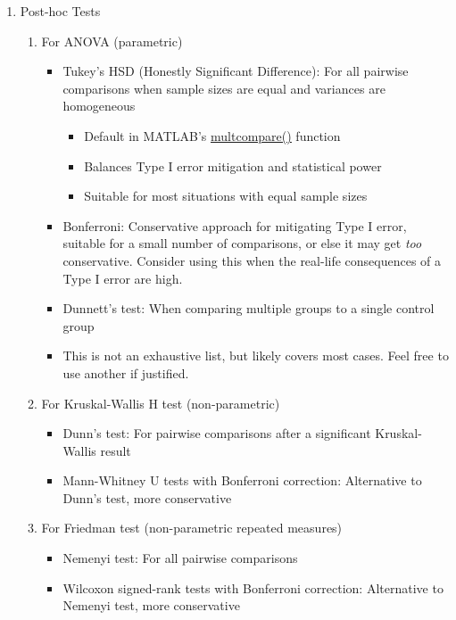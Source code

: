 \documentclass{article}
\newcommand{\ulink}[2]{\href{#1}{\ul{#2}}}
\begin{document}
\begin{enumerate}
    \item Post-hoc Tests
    \begin{enumerate}
        \item For ANOVA (parametric)
        \begin{itemize}
            \item Tukey's HSD (Honestly Significant Difference): For all pairwise comparisons when sample sizes are equal and variances are homogeneous
            \begin{itemize}
                \item Default in MATLAB's \ulink{https://www.mathworks.com/help/stats/multiple-comparisons.html\#bum7ue_-1}{multcompare()} function
                \item Balances Type I error mitigation and statistical power
                \item Suitable for most situations with equal sample sizes
            \end{itemize}
            \item Bonferroni: Conservative approach for mitigating Type I error, suitable for a small number of comparisons, or else it may get \textit{too} conservative. Consider using this when the real-life consequences of a Type I error are high.
            \item Dunnett's test: When comparing multiple groups to a single control group
            \item This is not an exhaustive list, but likely covers most cases. Feel free to use another if justified.
        \end{itemize}
        \item For Kruskal-Wallis H test (non-parametric)
        \begin{itemize}
            \item Dunn's test: For pairwise comparisons after a significant Kruskal-Wallis result
            \item Mann-Whitney U tests with Bonferroni correction: Alternative to Dunn's test, more conservative
        \end{itemize}
        \item For Friedman test (non-parametric repeated measures)
        \begin{itemize}
            \item Nemenyi test: For all pairwise comparisons
            \item Wilcoxon signed-rank tests with Bonferroni correction: Alternative to Nemenyi test, more conservative
        \end{itemize}
    \end{enumerate}
    

\end{enumerate}
\end{document}
